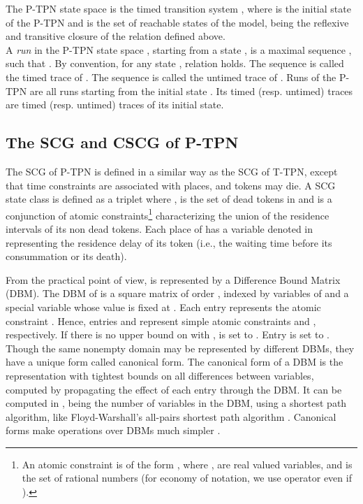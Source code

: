 \documentclass[submission,copyright,creativecommons]{eptcs}
\numberwithin{equation}{section}
\begin{document}
\par The P-TPN state space is the timed transition system , where  is the initial state of
the P-TPN and 
 is the set of reachable states of the model,  being the reflexive and transitive closure  of the relation  defined above.\\  A \emph{run} in the  P-TPN state space , starting from a state , is a maximal sequence , such that . By convention, for any state , relation  holds.
 The sequence  is called the timed trace of . The sequence  is called the untimed trace of . Runs of the P-TPN are all runs starting from the initial state . Its timed (resp. untimed) traces are timed (resp. untimed) traces of its initial state.

\subsection{The SCG and CSCG of P-TPN}
The SCG of P-TPN is defined in a similar way as the SCG of T-TPN, except that time constraints are associated with places, and tokens may die. A SCG state class is defined as a triplet  where ,   is the set of dead tokens in  and  is a conjunction of atomic constraints\footnote{An atomic constraint is of the form , where ,  are
real valued variables,  and  is the set of rational numbers (for economy of
notation, we use operator  even if ).}
characterizing the union of the residence intervals of its non dead tokens. Each place  of  has  a variable denoted  in  representing
the residence delay of its token (i.e., the waiting time before its consummation or its death).
\par From the practical point of view,  is represented by a Difference Bound Matrix (DBM). The DBM of  is a square matrix  of order , indexed by variables of  and a special variable  whose value is fixed at . Each entry  represents the atomic constraint . Hence, entries  and  represent simple atomic constraints  and , respectively. If there is no upper bound on  with ,  is set to . Entry  is set to . Though the same nonempty domain may be represented by different DBMs, they have a unique form called canonical form. The canonical form of a DBM is the representation with tightest bounds on all differences between variables, computed by propagating the effect of each entry through the DBM. It can be computed in ,  being the number of variables in the DBM, using a shortest path algorithm, like Floyd-Warshall's all-pairs shortest path algorithm \cite{Bouyer06}. Canonical forms make operations over DBMs much simpler \cite{Ben02}.
\end{document}
